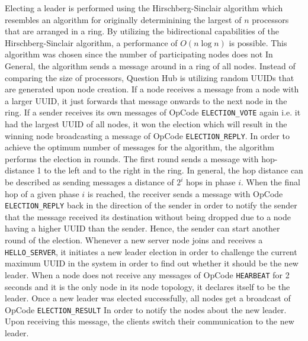 \documentclass[runningheads]{llncs}
\begin{document}
Electing a leader is performed using the Hirschberg-Sinclair algorithm which
resembles an algorithm for originally determinining the largest of $n$
processors that are arranged in a ring.
By utilizing the bidirectional capabilities of the Hirschberg-Sinclair
algorithm, a performance of $O(n\log{}n)$ is possible.\cite{hirschberg1980decentralized}
\newline
\newline
This algorithm was chosen since the number of participating nodes does not 
In General, the algorithm sends a message around in a ring of all nodes.
Instead of comparing the size of processors, Question Hub is utilizing
random UUIDs that are generated upon node creation. If a node receives a
message from a node with a larger UUID, it just forwards that message onwards
to the next node in the ring. If a sender receives its own messages of OpCode 
\texttt{ELECTION\_VOTE} again i.e. it had the largest UUID of all nodes, it won the
election which will result in the winning node broadcasting a message of
OpCode \texttt{ELECTION\_REPLY}. 
\newline
\newline
In order to achieve the optimum number of messages
for the algorithm, the algorithm performs the election in rounds. The first
round sends a message with hop-distance 1 to the left and to the right in the
ring. In general, the hop distance can be described as sending messages a
distance of $2^i$ hops in phase $i$. When the final hop of a given phase $i$ is
reached, the receiver sends a message with OpCode \texttt{ELECTION\_REPLY} back in the
direction of the sender in order to notify the sender that the message received
its destination without being dropped due to a node having a higher UUID than
the sender. Hence, the sender can start another round of the election.
\newline
\newline
Whenever a new server node joins and receives a \texttt{HELLO\_SERVER}, it initiates a
new leader election in order to challenge the current maximum UUID in the
system in order to find out whether it should be the new leader.
When a node does not receive any messages of OpCode \texttt{HEARBEAT} for 2 seconds
and it is the only node in its node topology, it declares itself to be the
leader. Once a new leader was elected successfully, all nodes get a broadcast of
OpCode \texttt{ELECTION\_RESULT} In order to notify the nodes about the new leader.
Upon receiving this message, the clients switch their communication to the
new leader.
\end{document}
